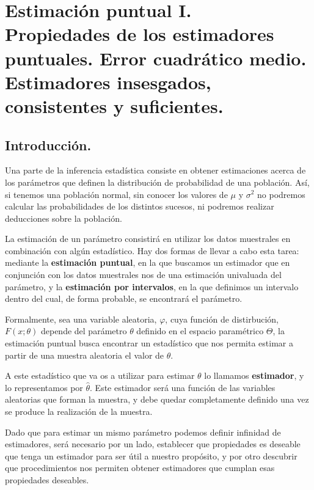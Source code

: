 \chapter[Estimaci\'on puntual I.]{Estimaci\'on puntual I. \\
\normalsize Propiedades de los estimadores puntuales. Error cuadr\'atico medio. Estimadores insesgados, consistentes y suficientes.}

\section{Introducci\'on.}

Una parte de la inferencia estad\'istica consiste en obtener estimaciones acerca de los par\'ametros que definen la distribuci\'on de probabilidad de una poblaci\'on. As\'i, si tenemos una poblaci\'on normal, sin conocer los valores de $\mu$ y $\sigma^2$ no podremos calcular las probabilidades de los distintos sucesos, ni podremos realizar deducciones sobre la poblaci\'on.

La estimaci\'on de un par\'ametro consistir\'a en utilizar los datos muestrales en combinaci\'on con alg\'un estad\'istico. Hay dos formas de llevar a cabo esta tarea: mediante la \textbf{estimaci\'on puntual}, en la que buscamos un estimador que en conjunci\'on con los datos muestrales nos de una estimaci\'on univaluada del par\'ametro, y la \textbf{estimaci\'on por intervalos}, en la que definimos un intervalo dentro del cual, de forma probable, se encontrar\'a el par\'ametro.

Formalmente, sea una variable aleatoria, $\varphi$, cuya funci\'on de distirbuci\'on, $F(x;\theta)$ depende del par\'ametro $\theta$ definido en el espacio param\'etrico $\Theta$, la estimaci\'on puntual busca encontrar un estad\'istico que nos permita estimar a partir de una muestra aleatoria el valor de $\theta$.

A este estad\'istico que va os a utilizar para estimar $\theta$ lo llamamos \textbf{estimador}, y lo representamos por $\hat{\theta}$. Este estimador ser\'a una funci\'on de las variables aleatorias que forman la muestra, y debe quedar completamente definido una vez se produce la realizaci\'on de la muestra.

Dado que para estimar un mismo par\'ametro podemos definir infinidad de estimadores, ser\'a necesario por un lado, establecer que propiedades es deseable que tenga un estimador para ser \'util a nuestro prop\'osito, y por otro descubrir que procedimientos nos permiten obtener estimadores que cumplan esas propiedades deseables.

